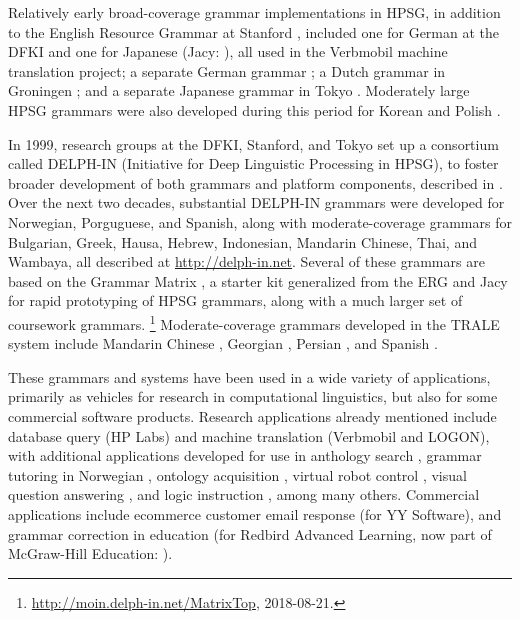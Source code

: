 \documentclass[output=paper]{langsci/langscibook}
\begin{document}
Relatively early broad-coverage grammar implementations in HPSG, in addition to the English Resource Grammar at Stanford \citep{erg}, included one for German at the DFKI \citep{MK2000a} and one for Japanese (Jacy: \citet{Siegel2000a}), all used in the Verbmobil machine translation project; a separate German grammar \citep{Babel}; a Dutch grammar in Groningen \citep{BvNM2001a-u}; and a separate Japanese grammar in Tokyo \citep{MNT2005a-u}.  Moderately large HPSG grammars were also developed during this period for Korean \citep{KY2003a-u} and Polish \citep{myk:etal:02}.  

In 1999, research groups at the DFKI, Stanford, and Tokyo set up a consortium called DELPH-IN
(Initiative for Deep Linguistic Processing in HPSG), to foster broader development of both grammars
and platform components, described in \citet{OFTU2002a-ed}.  Over the next two decades, substantial
DELPH-IN grammars were developed for Norwegian, Porguguese, and Spanish, along with
moderate-coverage grammars for Bulgarian, Greek, Hausa, Hebrew, Indonesian, Mandarin Chinese, Thai,
and Wambaya, all described at \url{http://delph-in.net}.  Several of these grammars are based on the
Grammar Matrix \citep{BFO2002a-u}, a starter kit generalized from the ERG and Jacy for rapid
prototyping of HPSG grammars, along with a much larger set of coursework
grammars. \footnote{\url{http://moin.delph-in.net/MatrixTop}, 2018-08-21.} Moderate-coverage grammars developed in the TRALE system include Mandarin Chinese \citep{ML2013a}, Georgian \citep{Abzianidze2011a-u}, Persian \citep{MG2010a}, and Spanish \citep{Machicao-y-Priemer2015a}.

These grammars and systems have been used in a wide variety of applications, primarily as vehicles for research in computational linguistics, but also for some commercial software products.  Research applications already mentioned include database query (HP Labs) and machine translation (Verbmobil and LOGON), with additional applications developed for use in anthology search \citep{Sch:Kie:Spu:11}, grammar tutoring in Norwegian \citep{Hellanetal:13}, ontology acquisition \citep{Herb:Cope:06}, virtual robot control \citep{packard2014uw}, visual question answering \citep{DBLP:journals/corr/KuhnleC17}, and logic instruction \citep{Flickinger:17}, among many others.  Commercial applications include ecommerce customer email response (for YY Software), and grammar correction in education (for Redbird Advanced Learning, now part of McGraw-Hill Education: \citet{Suppesetal:12}).
\end{document}
